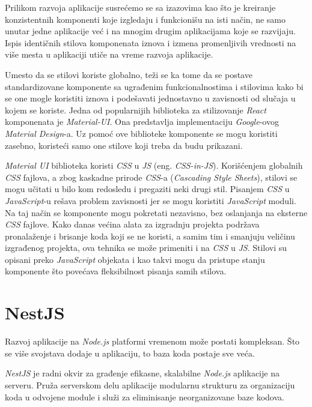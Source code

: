 Prilikom razvoja aplikacije susrećemo se sa izazovima kao što je kreiranje konzistentnih komponenti koje izgledaju i funkcionišu 
na isti način, ne samo unutar jedne aplikacije već i na mnogim drugim aplikacijama koje se razvijaju. Ispis identičnih stilova 
komponenata iznova i izmena promenljivih vrednosti na više mesta u aplikaciji utiče na vreme razvoja aplikacije.

Umesto da se stilovi koriste globalno, teži se ka tome da se postave standardizovane komponente sa ugrađenim funkcionalnostima i 
stilovima kako bi se one mogle koristiti iznova i podešavati jednostavno u zavisnosti od slučaja u kojem se koriste.
Jedna od popularnijih biblioteka za stilizovanje \textit{React} komponenata je \textit{Material-UI}. Ona predstavlja 
implementaciju \textit{Google}-ovog \textit{Material Design}-a. Uz pomoć ove biblioteke komponente se mogu koristiti zasebno, 
koristeći samo one stilove koji treba da budu prikazani.

\textit{Material UI} biblioteka koristi \textit{CSS} u \textit{JS} (eng. \textit{CSS-in-JS}). Korišćenjem globalnih \textit{CSS} 
fajlova, a zbog kaskadne prirode \textit{CSS}-a (\textit{Cascading Style Sheets}), stilovi se mogu učitati u bilo kom redosledu 
i pregaziti neki drugi stil. Pisanjem \textit{CSS} u \textit{JavaScript}-u rešava problem zavisnosti jer se mogu koristiti 
\textit{JavaScript} moduli. Na taj način se komponente mogu pokretati nezavisno, bez oslanjanja na eksterne \textit{CSS} fajlove. 
Kako danas većina alata za izgradnju projekta podržava pronalaženje i brisanje koda koji se ne koristi, a samim tim i smanjuju 
veličinu izgrađenog projekta, ova tehnika se može primeniti i na \textit{CSS} u \textit{JS}. Stilovi su opisani preko 
\textit{JavaScript} objekata i kao takvi mogu da pristupe stanju komponente što povećava fleksibilnost pisanja samih stilova.


\section{NestJS}\label{sec:nestjs}
Razvoj aplikacije na \textit{Node.js} platformi vremenom može postati kompleksan. Što se više svojstava 
dodaje u aplikaciju, to baza koda postaje sve veća.

\textit{NestJS} je radni okvir za građenje efikasne, skalabilne \textit{Node.js} aplikacije na serveru. 
Pruža serverskom delu aplikacije modularnu strukturu za organizaciju koda u odvojene module i služi 
za eliminisanje neorganizovane baze kodova.

